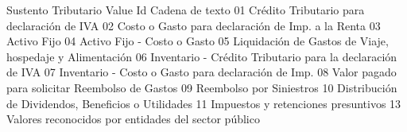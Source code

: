 


Sustento Tributario
Value Id   Cadena de texto
01         Crédito Tributario para declaración de IVA 
02         Costo o Gasto para declaración de Imp. a la Renta
03         Activo Fijo
04         Activo Fijo - Costo o Gasto
05         Liquidación de Gastos de Viaje, hospedaje y Alimentación
06         Inventario - Crédito Tributario para la declaración de IVA
07         Inventario - Costo o Gasto para declaración de Imp.
08         Valor pagado para solicitar Reembolso de Gastos
09         Reembolso por Siniestros
10         Distribución de Dividendos, Beneficios o Utilidades
11         Impuestos y retenciones presuntivos
13         Valores reconocidos por entidades del sector público




